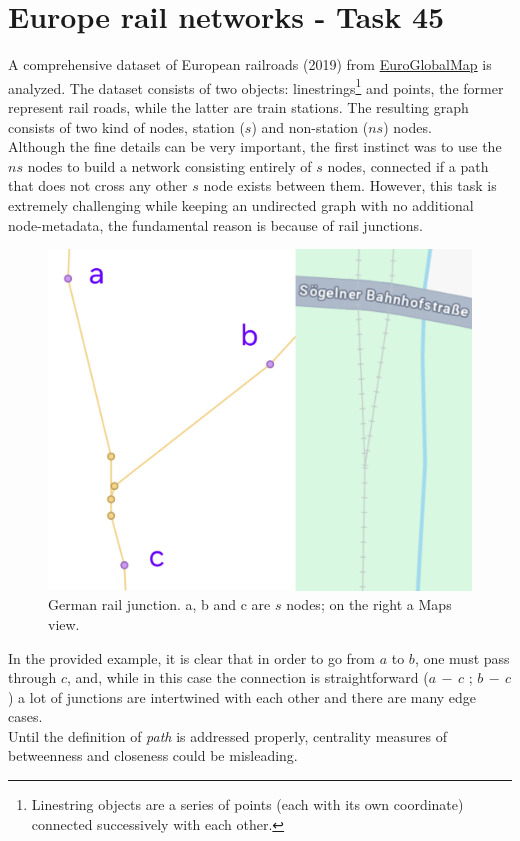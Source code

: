 \chapter{Europe rail networks - Task 45}

A comprehensive dataset of European railroads (2019) from \href{https://www.mapsforeurope.org/datasets/euro-global-map}{EuroGlobalMap} is analyzed. 
The dataset consists of two objects: linestrings\footnote{Linestring objects are a series of points (each with its own coordinate) connected successively with each other.} and points, the former represent rail roads, while the latter are train stations. 
The resulting graph consists of two kind of nodes, station ($s$) and non-station ($ns$) nodes.\\
Although the fine details can be very important, the first instinct was to use the $ns$ nodes to build a network consisting entirely of $s$ nodes, connected if a path that does not cross any other $s$ node exists between them. However, this task is extremely challenging while keeping an undirected graph with no additional node-metadata, the fundamental reason is because of rail junctions.

\begin{figure}  
\label{fig: junctionexample}
  \centering
  \vspace{-\baselineskip}    %
  \includegraphics[width=\linewidth,keepaspectratio]{images/junction_example.jpg}
  \caption{German rail junction. a, b and c are $s$ nodes; on the right a Maps view.}
  \label{fig:junction}
\end{figure}
In the provided example, it is clear that in order to go from $a$ to $b$, one must pass through $c$, and, while in this case the connection is straightforward ($a \, - \, c$  ;  $b\, - \, c$) a lot of junctions are intertwined with each other and there are many edge cases.\\
Until the definition of \emph{path} is addressed properly, centrality measures of betweenness and closeness could be misleading.

